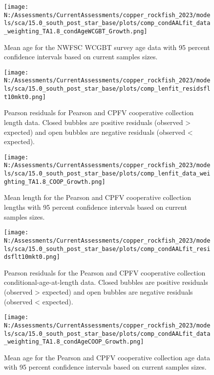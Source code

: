 \documentclass[11pt,
  english,
  letterpaper,
]{article}
\begin{document}
\pagebreak

\begin{figure}
\centering
\texttt{[image: N:/Assessments/CurrentAssessments/copper\_rockfish\_2023/models/sca/15.0\_south\_post\_star\_base/plots/comp\_condAALfit\_data\_weighting\_TA1.8\_condAgeWCGBT\_Growth.png]}
\caption{Mean age for the NWFSC WCGBT survey age data with 95 percent confidence intervals based on current samples sizes.\label{fig:wcgbt-mean-age-fit}}
\end{figure}

\pagebreak

\begin{figure}
\centering
\texttt{[image: N:/Assessments/CurrentAssessments/copper\_rockfish\_2023/models/sca/15.0\_south\_post\_star\_base/plots/comp\_lenfit\_residsflt10mkt0.png]}
\caption{Pearson residuals for Pearson and CPFV cooperative collection length data. Closed bubbles are positive residuals (observed \textgreater{} expected) and open bubbles are negative residuals (observed \textless{} expected).\label{fig:coop-len-pearson}}
\end{figure}

\pagebreak

\begin{figure}
\centering
\texttt{[image: N:/Assessments/CurrentAssessments/copper\_rockfish\_2023/models/sca/15.0\_south\_post\_star\_base/plots/comp\_lenfit\_data\_weighting\_TA1.8\_COOP\_Growth.png]}
\caption{Mean length for the Pearson and CPFV cooperative collection lengths with 95 percent confidence intervals based on current samples sizes.\label{fig:coop-mean-len-fit}}
\end{figure}

\pagebreak

\begin{figure}
\centering
\texttt{[image: N:/Assessments/CurrentAssessments/copper\_rockfish\_2023/models/sca/15.0\_south\_post\_star\_base/plots/comp\_condAALfit\_residsflt10mkt0.png]}
\caption{Pearson residuals for the Pearson and CPFV cooperative collection conditional-age-at-length data. Closed bubbles are positive residuals (observed \textgreater{} expected) and open bubbles are negative residuals (observed \textless{} expected).\label{fig:coop-age-pearson}}
\end{figure}

\pagebreak

\begin{figure}
\centering
\texttt{[image: N:/Assessments/CurrentAssessments/copper\_rockfish\_2023/models/sca/15.0\_south\_post\_star\_base/plots/comp\_condAALfit\_data\_weighting\_TA1.8\_condAgeCOOP\_Growth.png]}
\caption{Mean age for the Pearson and CPFV cooperative collection age data with 95 percent confidence intervals based on current samples sizes.\label{fig:coop-mean-age-fit}}
\end{figure}
\end{document}

